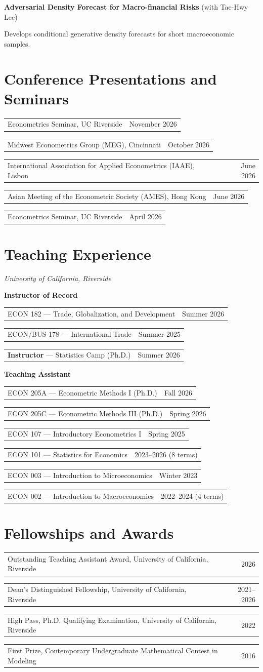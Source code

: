 \documentclass[11pt,letterpaper]{article}
\makeatletter
\newcommand{\cvrow}[2]{\begin{tabularx}{\textwidth}{@{}Xr@{}}#1&#2\end{tabularx}\par\vspace{0.5pt}}
\makeatother
\begin{document}
\vspace{1pt}
\textbf{Adversarial Density Forecast for Macro-financial Risks} {\small\normalfont (with Tae-Hwy Lee)}\par
{\small Develops conditional generative density forecasts for short macroeconomic samples.}\par

\section{Conference Presentations and Seminars}
\cvrow{Econometrics Seminar, UC Riverside}{November 2026}
\cvrow{Midwest Econometrics Group (MEG), Cincinnati}{October 2026}
\cvrow{International Association for Applied Econometrics (IAAE), Lisbon}{June 2026}
\cvrow{Asian Meeting of the Econometric Society (AMES), Hong Kong}{June 2026}
\cvrow{Econometrics Seminar, UC Riverside}{April 2026}

\section{Teaching Experience}
\textit{University of California, Riverside}\par
\vspace{2pt}
\textbf{Instructor of Record}\par
\cvrow{ECON 182 --- Trade, Globalization, and Development}{Summer 2026}
\cvrow{ECON/BUS 178 --- International Trade}{Summer 2025}
\cvrow{\textbf{Instructor} --- Statistics Camp (Ph.D.)}{Summer 2026}
\vspace{1pt}
\textbf{Teaching Assistant}\par
\cvrow{ECON 205A --- Econometric Methods I (Ph.D.)}{Fall 2026}
\cvrow{ECON 205C --- Econometric Methods III (Ph.D.)}{Spring 2026}
\cvrow{ECON 107 --- Introductory Econometrics I}{Spring 2025}
\cvrow{ECON 101 --- Statistics for Economics}{2023--2026 (8 terms)}
\cvrow{ECON 003 --- Introduction to Microeconomics}{Winter 2023}
\cvrow{ECON 002 --- Introduction to Macroeconomics}{2022--2024 (4 terms)}

\section{Fellowships and Awards}
\cvrow{Outstanding Teaching Assistant Award, University of California, Riverside}{2026}
\cvrow{Dean's Distinguished Fellowship, University of California, Riverside}{2021--2026}
\cvrow{High Pass, Ph.D. Qualifying Examination, University of California, Riverside}{2022}
\cvrow{First Prize, Contemporary Undergraduate Mathematical Contest in Modeling}{2016}
\end{document}
